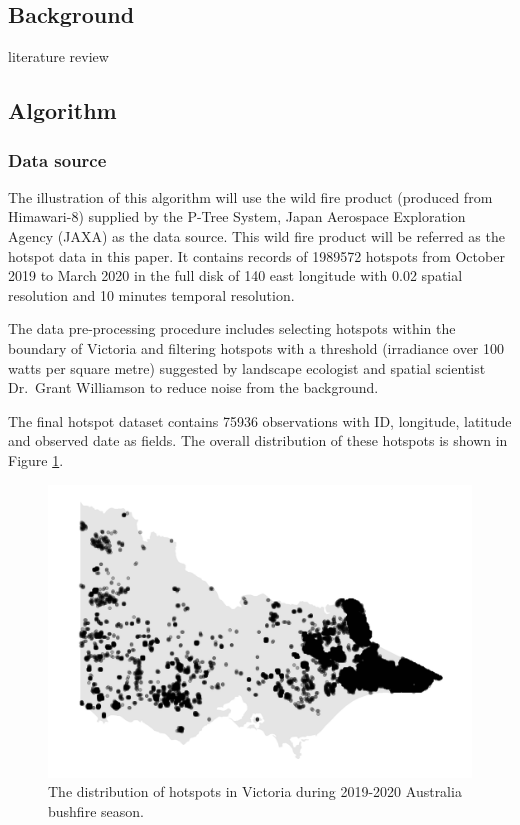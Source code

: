 \hypertarget{background}{%
\subsection{Background}\label{background}}

literature review

\hypertarget{algorithm}{%
\subsection{Algorithm}\label{algorithm}}

\hypertarget{data-source}{%
\subsubsection{Data source}\label{data-source}}

The illustration of this algorithm will use the wild fire product
(produced from Himawari-8) supplied by the P-Tree System, Japan
Aerospace Exploration Agency (JAXA) \citeyearpar{jaxa} as the data
source. This wild fire product will be referred as the hotspot data in
this paper. It contains records of 1989572 hotspots from October 2019 to
March 2020 in the full disk of 140 \textdegree east longitude with 0.02
\textdegree spatial resolution and 10 minutes temporal resolution.

The data pre-processing procedure includes selecting hotspots within the
boundary of Victoria and filtering hotspots with a threshold (irradiance
over 100 watts per square metre) suggested by landscape ecologist and
spatial scientist Dr.~Grant Williamson \citeyearpar{hotspots} to reduce
noise from the background.

The final hotspot dataset contains 75936 observations with ID,
longitude, latitude and observed date as fields. The overall
distribution of these hotspots is shown in Figure \ref{fig:hotspots}.

\begin{Schunk}
\begin{figure}

{\centering \includegraphics[width=0.8\linewidth]{figures/before_clustering} 

}

\caption[The distribution of hotspots in Victoria during 2019-2020 Australia bushfire season]{The distribution of hotspots in Victoria during 2019-2020 Australia bushfire season.}\label{fig:hotspots}
\end{figure}
\end{Schunk}

